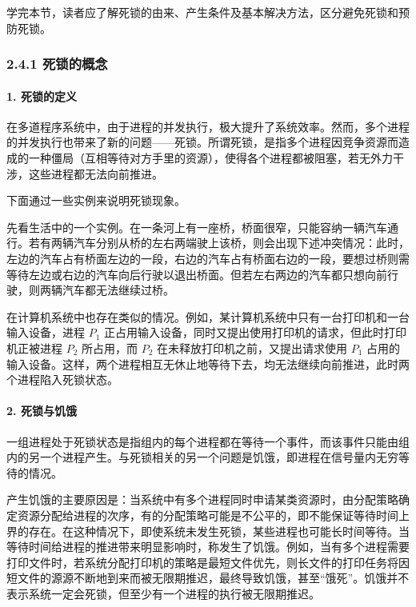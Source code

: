 \documentclass{ctexbook}
\begin{document}
学完本节，读者应了解死锁的由来、产生条件及基本解决方法，区分避免死锁和预防死锁。

\subsubsection{2.4.1 死锁的概念}

\paragraph{1. 死锁的定义}

在多道程序系统中，由于进程的并发执行，极大提升了系统效率。然而，多个进程的并发执行也带来了新的问题——死锁。所谓死锁，是指多个进程因竞争资源而造成的一种僵局（互相等待对方手里的资源），使得各个进程都被阻塞，若无外力干涉，这些进程都无法向前推进。

下面通过一些实例来说明死锁现象。

先看生活中的一个实例。在一条河上有一座桥，桥面很窄，只能容纳一辆汽车通行。若有两辆汽车分别从桥的左右两端驶上该桥，则会出现下述冲突情况：此时，左边的汽车占有桥面左边的一段，右边的汽车占有桥面右边的一段，要想过桥则需等待左边或右边的汽车向后行驶以退出桥面。但若左右两边的汽车都只想向前行驶，则两辆汽车都无法继续过桥。

在计算机系统中也存在类似的情况。例如，某计算机系统中只有一台打印机和一台输入设备，进程 $P_1$ 正占用输入设备，同时又提出使用打印机的请求，但此时打印机正被进程 $P_2$ 所占用，而 $P_2$ 在未释放打印机之前，又提出请求使用 $P_1$ 占用的输入设备。这样，两个进程相互无休止地等待下去，均无法继续向前推进，此时两个进程陷入死锁状态。

\paragraph{2. 死锁与饥饿}

一组进程处于死锁状态是指组内的每个进程都在等待一个事件，而该事件只能由组内的另一个进程产生。与死锁相关的另一个问题是饥饿，即进程在信号量内无穷等待的情况。

产生饥饿的主要原因是：当系统中有多个进程同时申请某类资源时，由分配策略确定资源分配给进程的次序，有的分配策略可能是不公平的，即不能保证等待时间上界的存在。在这种情况下，即使系统未发生死锁，某些进程也可能长时间等待。当等待时间给进程的推进带来明显影响时，称发生了饥饿。例如，当有多个进程需要打印文件时，若系统分配打印机的策略是最短文件优先，则长文件的打印任务将因短文件的源源不断地到来而被无限期推迟，最终导致饥饿，甚至“饿死”。饥饿并不表示系统一定会死锁，但至少有一个进程的执行被无限期推迟。
\end{document}
